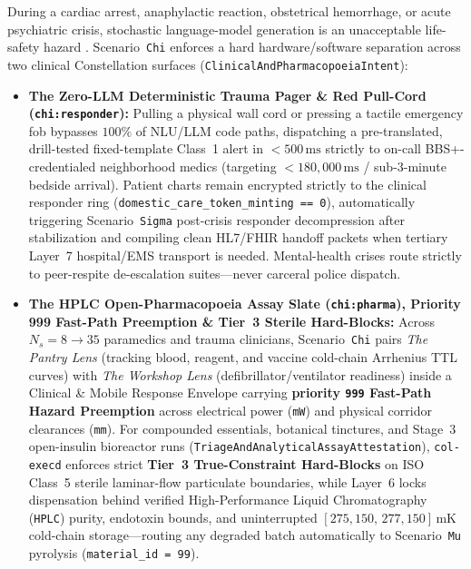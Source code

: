 During a cardiac arrest, anaphylactic reaction, obstetrical hemorrhage, or acute psychiatric crisis, stochastic language-model generation is an unacceptable life-safety hazard \parencite{iec61508}. Scenario~\texttt{Chi} enforces a hard hardware/software separation across two clinical Constellation surfaces (\texttt{ClinicalAndPharmacopoeiaIntent}):
\begin{itemize}
    \item \textbf{The Zero-LLM Deterministic Trauma Pager \& Red Pull-Cord (\texttt{chi:responder}):} Pulling a physical wall cord or pressing a tactile emergency fob bypasses $100\%$ of NLU/LLM code paths, dispatching a pre-translated, drill-tested fixed-template Class~1 alert in $< 500\,\mathrm{ms}$ strictly to on-call BBS+-credentialed neighborhood medics (targeting $< 180{,}000\,\mathrm{ms}$ / sub-3-minute bedside arrival). Patient charts remain encrypted strictly to the clinical responder ring (\texttt{domestic\_care\_token\_minting == 0}), automatically triggering Scenario~\texttt{Sigma} post-crisis responder decompression after stabilization and compiling clean HL7/FHIR handoff packets when tertiary Layer~7 hospital/EMS transport is needed. Mental-health crises route strictly to peer-respite de-escalation suites---never carceral police dispatch.
    \item \textbf{The HPLC Open-Pharmacopoeia Assay Slate (\texttt{chi:pharma}), Priority 999 Fast-Path Preemption \& Tier~3 Sterile Hard-Blocks:} Across $N_s = 8 \to 35$ paramedics and trauma clinicians, Scenario~\texttt{Chi} pairs \textit{The Pantry Lens} (tracking blood, reagent, and vaccine cold-chain Arrhenius TTL curves) with \textit{The Workshop Lens} (defibrillator/ventilator readiness) inside a Clinical \& Mobile Response Envelope carrying \textbf{priority \texttt{999} Fast-Path Hazard Preemption} across electrical power (\texttt{mW}) and physical corridor clearances (\texttt{mm}). For compounded essentials, botanical tinctures, and Stage~3 open-insulin bioreactor runs (\texttt{TriageAndAnalyticalAssayAttestation}), \texttt{col-execd} enforces strict \textbf{Tier~3 True-Constraint Hard-Blocks} on ISO Class~5 sterile laminar-flow particulate boundaries, while Layer~6 locks dispensation behind verified High-Performance Liquid Chromatography (\texttt{HPLC}) purity, endotoxin bounds, and uninterrupted $[275{,}150,\, 277{,}150]\,\mathrm{mK}$ cold-chain storage---routing any degraded batch automatically to Scenario~\texttt{Mu} pyrolysis (\texttt{material\_id = 99}).
\end{itemize}

